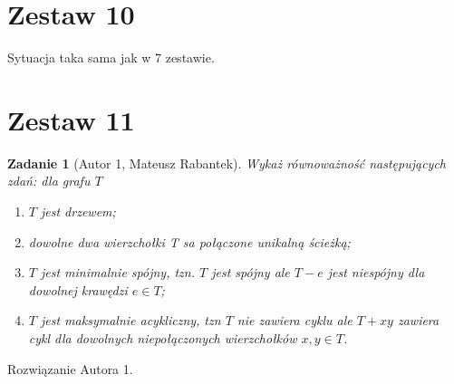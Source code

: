\documentclass{mwart}
\newtheorem{zad}{Zadanie}[section]
\begin{document}
\newpage
\section{Zestaw 10}          %
Sytuacja taka sama jak w 7 zestawie.












\newpage
\section{Zestaw 11}          %

\begin{zad}[Autor 1, Mateusz Rabantek]
    Wykaż równoważność następujących zdań: dla grafu $T$
    \begin{enumerate}
        \item $T$ jest drzewem;
        \item dowolne dwa wierzchołki T sa połączone unikalną ścieżką;
        \item $T$ jest minimalnie spójny, tzn. $T$ jest spójny ale $T - e$ jest niespójny dla dowolnej krawędzi $e \in T$;
        \item $T$ jest maksymalnie acykliczny, tzn $T$ nie zawiera cyklu ale $T+ xy$ zawiera cykl dla dowolnych niepołączonych wierzchołków $x,y \in T$.
    \end{enumerate}
\end{zad}\begin{mdframed}
    Rozwiązanie Autora 1.
\end{mdframed}
\end{document}
